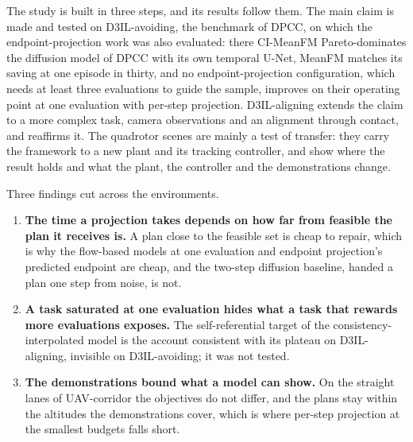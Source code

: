 The study is built in three steps, and its results follow them. The main claim is made and tested on
D3IL-avoiding, the benchmark of \ac{DPCC}, on which the endpoint-projection work was also evaluated: there
CI-MeanFM Pareto-dominates the diffusion model of \ac{DPCC} with its own temporal U-Net, MeanFM matches its
saving at one episode in thirty, and no
endpoint-projection configuration, which needs at least three evaluations to guide the sample, improves on their
operating point at one evaluation with per-step projection. D3IL-aligning extends the claim to a more complex
task, camera observations and an alignment through contact, and reaffirms it. The quadrotor scenes are mainly a
test of transfer: they carry the framework to a new plant and its tracking controller, and show where the result
holds and what the plant, the controller and the demonstrations change.

Three findings cut across the environments.

\begin{enumerate}
  \item \textbf{The time a projection takes depends on how far from feasible the plan it receives is.} A plan close to the
    feasible set is cheap to repair, which is why the flow-based models at one evaluation and endpoint
    projection's predicted endpoint are cheap, and the two-step diffusion baseline, handed a plan one step
    from noise, is not.
  \item \textbf{A task saturated at one evaluation hides what a task that rewards more evaluations exposes.}
    The self-referential target of the consistency-interpolated model is the account consistent with its
    plateau on D3IL-aligning, invisible on D3IL-avoiding; it was not tested.
  \item \textbf{The demonstrations bound what a model can show.} On the straight lanes of UAV-corridor the
    objectives do not differ, and the plans stay within the altitudes the demonstrations cover, which is
    where per-step projection at the smallest budgets falls short.
\end{enumerate}


